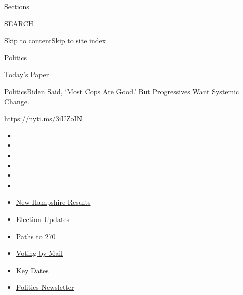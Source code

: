 Sections

SEARCH

\protect\hyperlink{site-content}{Skip to
content}\protect\hyperlink{site-index}{Skip to site index}

\href{https://www.nytimes3xbfgragh.onion/section/politics}{Politics}

\href{https://myaccount.nytimes3xbfgragh.onion/auth/login?response_type=cookie\&client_id=vi}{}

\href{https://www.nytimes3xbfgragh.onion/section/todayspaper}{Today's
Paper}

\href{/section/politics}{Politics}\textbar{}Biden Said, `Most Cops Are
Good.' But Progressives Want Systemic Change.

\url{https://nyti.ms/3iUZoIN}

\begin{itemize}
\item
\item
\item
\item
\item
\item
\end{itemize}

\begin{itemize}
\item
  \href{https://www.nytimes3xbfgragh.onion/interactive/2020/09/08/us/elections/results-new-hampshire-primary-elections.html?action=click\&pgtype=Article\&state=default\&region=TOP_BANNER\&context=storylines_menu}{New
  Hampshire Results}
\item
  \href{https://www.nytimes3xbfgragh.onion/live/2020/09/08/us/trump-vs-biden?action=click\&pgtype=Article\&state=default\&region=TOP_BANNER\&context=storylines_menu}{Election
  Updates}
\item
  \href{https://www.nytimes3xbfgragh.onion/interactive/2020/us/elections/election-states-biden-trump.html?action=click\&pgtype=Article\&state=default\&region=TOP_BANNER\&context=storylines_menu}{Paths
  to 270}
\item
  \href{https://www.nytimes3xbfgragh.onion/interactive/2020/08/31/us/politics/vote-by-mail-deadlines.html?action=click\&pgtype=Article\&state=default\&region=TOP_BANNER\&context=storylines_menu}{Voting
  by Mail}
\item
  \href{https://www.nytimes3xbfgragh.onion/interactive/2019/us/elections/2020-presidential-election-calendar.html?action=click\&pgtype=Article\&state=default\&region=TOP_BANNER\&context=storylines_menu}{Key
  Dates}
\item
  \href{https://www.nytimes3xbfgragh.onion/newsletters/politics?action=click\&pgtype=Article\&state=default\&region=TOP_BANNER\&context=storylines_menu}{Politics
  Newsletter}
\end{itemize}

